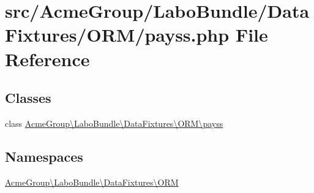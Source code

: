 \hypertarget{payss_8php}{\section{src/\+Acme\+Group/\+Labo\+Bundle/\+Data\+Fixtures/\+O\+R\+M/payss.php File Reference}
\label{payss_8php}
}
\subsection*{Classes}
\begin{DoxyCompactItemize}
\item 
class \hyperlink{class_acme_group_1_1_labo_bundle_1_1_data_fixtures_1_1_o_r_m_1_1payss}{Acme\+Group\textbackslash{}\+Labo\+Bundle\textbackslash{}\+Data\+Fixtures\textbackslash{}\+O\+R\+M\textbackslash{}payss}
\end{DoxyCompactItemize}
\subsection*{Namespaces}
\begin{DoxyCompactItemize}
\item 
 \hyperlink{namespace_acme_group_1_1_labo_bundle_1_1_data_fixtures_1_1_o_r_m}{Acme\+Group\textbackslash{}\+Labo\+Bundle\textbackslash{}\+Data\+Fixtures\textbackslash{}\+O\+R\+M}
\end{DoxyCompactItemize}
